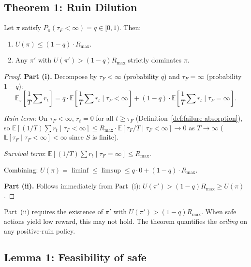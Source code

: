 \subsection{Theorem 1: Ruin Dilution}

\begin{theorem}
\label{thm:tf-v4-ruin-dilution}
Let $\pi$ satisfy $P_\pi(\tau_F < \infty) = q \in [0, 1)$. Then:
\begin{enumerate}
\item[(i)] $U(\pi) \le (1 - q) \cdot R_{\max}$.
\item[(ii)] Any $\pi'$ with $U(\pi') > (1 - q) R_{\max}$ strictly
dominates $\pi$.
\end{enumerate}
\end{theorem}

\begin{proof}
\medskip\noindent\textbf{Part (i).}
Decompose by $\tau_F < \infty$ (probability $q$) and
$\tau_F = \infty$ (probability $1 - q$):
\begin{equation}
\mathbb{E}_\pi\!\left[\frac{1}{T} \sum r_t\right]
=
q \cdot \mathbb{E}\!\left[
\frac{1}{T} \sum r_t \mid \tau_F < \infty
\right]
+ (1 - q) \cdot \mathbb{E}\!\left[
\frac{1}{T} \sum r_t \mid \tau_F = \infty
\right].
\end{equation}

\textit{Ruin term}: On $\tau_F < \infty$, $r_t = 0$ for all $t \ge
\tau_F$ (Definition~\ref{def:failure-absorption}), so
$\mathbb{E}[(1/T) \sum r_t \mid \tau_F < \infty] \le R_{\max} \cdot
\mathbb{E}[\tau_F / T \mid \tau_F < \infty] \to 0$ as $T \to \infty$
($\mathbb{E}[\tau_F \mid \tau_F < \infty] < \infty$ since $S$ is
finite).

\textit{Survival term}: $\mathbb{E}[(1/T) \sum r_t \mid \tau_F =
\infty] \le R_{\max}$.

Combining: $U(\pi) = \liminf \le \limsup \le q \cdot 0 + (1 - q)
\cdot R_{\max}$.

\medskip\noindent\textbf{Part (ii).}
Follows immediately from Part~(i): $U(\pi') > (1 - q) R_{\max} \ge
U(\pi)$.
\end{proof}

\begin{remark}[Scope]
Part~(ii) requires the existence of $\pi'$ with $U(\pi') > (1 - q)
R_{\max}$. When safe actions yield low reward, this may not hold.
The theorem quantifies the \emph{ceiling} on any positive-ruin
policy.
\end{remark}

\subsection{Lemma 1: Feasibility of safe}

